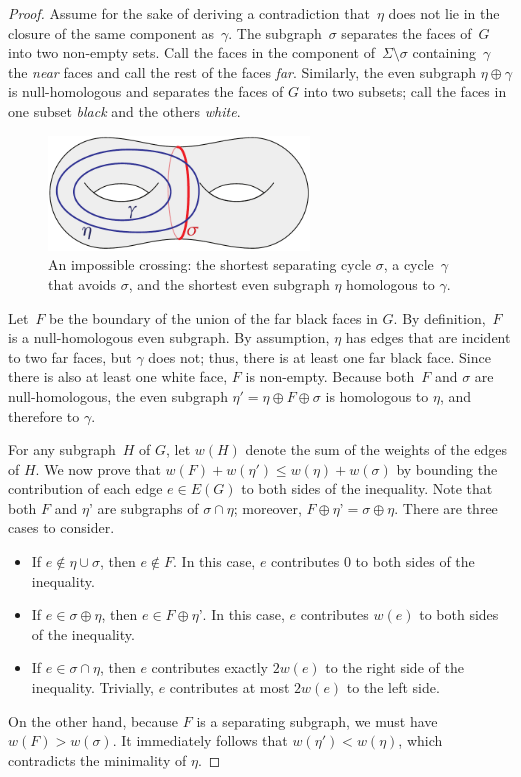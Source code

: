 \documentclass[twoside,leqno,twocolumn]{article}
\begin{document}
\begin{proof}
Assume for the sake of deriving a contradiction that~$\eta$ does not lie in the closure of the same component as~$\gamma$.  The subgraph~$\sigma$ separates the faces of~$G$ into two non-empty sets.  Call the faces in the component of~$\Sigma \setminus \sigma$ containing~$\gamma$ the \emph{near} faces and call the rest of the faces  \emph{far}.  Similarly, the even subgraph $\eta \oplus \gamma$ is null-homologous and separates the faces of $G$ into two subsets; call the faces in one subset \emph{black} and the others \emph{white}.

\begin{figure}[h]
\centering
\includegraphics[height=1.2in]{Fig/lemma61}
\caption{An impossible crossing: the shortest separating cycle $\sigma$, a cycle~$\gamma$ that avoids $\sigma$, and the shortest even subgraph $\eta$ homologous to $\gamma$.}
\label{F:lemma61}
\end{figure}

Let~$F$ be the boundary of the union of the far black faces in $G$.  By definition,~$F$ is a null-homologous even subgraph.  By assumption, $\eta$ has edges that are incident to two far faces, but $\gamma$ does not; thus, there is at least one far black face.  Since there is also at least one white face, $F$ is non-empty.  Because both~$F$ and $\sigma$ are null-homologous, the even subgraph $\eta' = \eta \oplus F \oplus \sigma$ is homologous to $\eta$, and therefore to $\gamma$.

For any subgraph~$H$ of $G$, let $w(H)$ denote the sum of the weights of the edges of $H$.  We now prove that $w(F) + w(\eta') \leq w(\eta) + w(\sigma)$ by bounding the contribution of each edge $e \in E(G)$ to both sides of the inequality.  Note that both $F$ and $\eta’$ are subgraphs of $\sigma\cap \eta$; moreover, $F \oplus \eta’ = \sigma \oplus \eta$.  There are three cases to consider.
\begin{itemize}
\item
If $e \not\in \eta \cup \sigma$, then $e \not\in F$.  In this case, $e$ contributes $0$ to both sides of the inequality.
\item
If $e \in \sigma \oplus \eta$, then $e \in F \oplus \eta’$.  In this case, $e$ contributes $w(e)$ to both sides of the inequality.
\item
If $e \in \sigma \cap \eta$, then $e$ contributes exactly $2w(e)$ to the right side of the inequality.  Trivially, $e$ contributes at most $2w(e)$ to the left side.
\end{itemize}

On the other hand, because $F$ is a separating subgraph, we must have $w(F) > w(\sigma)$.  It immediately follows that $w(\eta') < w(\eta)$, which contradicts the minimality of $\eta$.
\end{proof}
\end{document}
